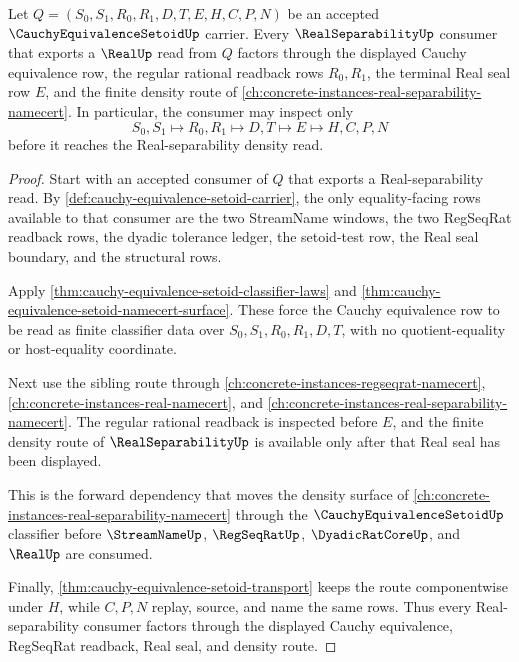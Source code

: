 \begin{theorem}
\label{thm:cauchy-equivalence-setoid-real-separability-route}
Let $Q=(S_0,S_1,R_0,R_1,D,T,E,H,C,P,N)$ be an accepted $\CauchyEquivalenceSetoidUp$ carrier. Every $\RealSeparabilityUp$ consumer that exports a $\RealUp$ read from $Q$ factors through the displayed Cauchy equivalence row, the regular rational readback rows $R_0,R_1$, the terminal Real seal row $E$, and the finite density route of \autoref{ch:concrete-instances-real-separability-namecert}. In particular, the consumer may inspect only
$$
S_0,S_1 \longmapsto R_0,R_1 \longmapsto D,T \longmapsto E \longmapsto H,C,P,N
$$
before it reaches the Real-separability density read.
\end{theorem}
\begin{proof}
Start with an accepted consumer of $Q$ that exports a Real-separability read. By \autoref{def:cauchy-equivalence-setoid-carrier}, the only equality-facing rows available to that consumer are the two StreamName windows, the two RegSeqRat readback rows, the dyadic tolerance ledger, the setoid-test row, the Real seal boundary, and the structural rows.

Apply \autoref{thm:cauchy-equivalence-setoid-classifier-laws} and \autoref{thm:cauchy-equivalence-setoid-namecert-surface}. These force the Cauchy equivalence row to be read as finite classifier data over $S_0,S_1,R_0,R_1,D,T$, with no quotient-equality or host-equality coordinate.

Next use the sibling route through \autoref{ch:concrete-instances-regseqrat-namecert}, \autoref{ch:concrete-instances-real-namecert}, and \autoref{ch:concrete-instances-real-separability-namecert}. The regular rational readback is inspected before $E$, and the finite density route of $\RealSeparabilityUp$ is available only after that Real seal has been displayed.

This is the forward dependency that moves the density surface of \autoref{ch:concrete-instances-real-separability-namecert} through the $\CauchyEquivalenceSetoidUp$ classifier before $\StreamNameUp$, $\RegSeqRatUp$, $\DyadicRatCoreUp$, and $\RealUp$ are consumed.

Finally, \autoref{thm:cauchy-equivalence-setoid-transport} keeps the route componentwise under $H$, while $C,P,N$ replay, source, and name the same rows. Thus every Real-separability consumer factors through the displayed Cauchy equivalence, RegSeqRat readback, Real seal, and density route.
\end{proof}

